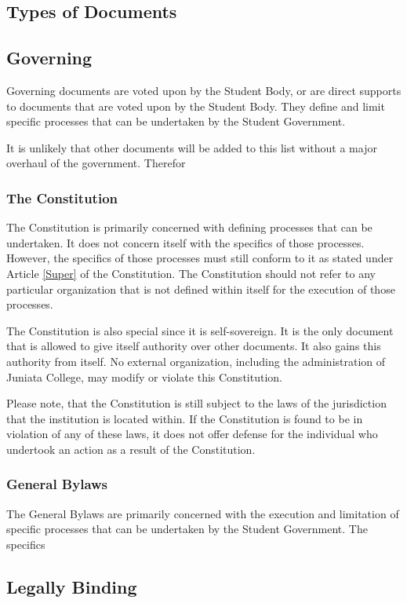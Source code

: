 \documentclass[12pt, letterpaper]{report}
\begin{document}
	\begin{linenumbers}
	\modulolinenumbers[5]
	\pagewiselinenumbers
	\chapter{Types of Documents}
        \section{Governing}
        Governing documents are voted upon by the Student Body, or are direct supports to documents that are voted upon by the Student Body. They define and limit specific processes that can be undertaken by the Student Government.  \par It is unlikely that other documents will be added to this list without a major overhaul of the government. Therefor
        \subsection{The Constitution}
        The Constitution is primarily concerned with defining processes that can be undertaken. It does not concern itself with the specifics of those processes. However, the specifics of those processes must still conform to it as stated under Article \ref{Super} of the Constitution. The Constitution should not refer to any particular organization that is not defined within itself for the execution of those processes.
        \par The Constitution is also special since it is self-sovereign. It is the only document that is allowed to give itself authority over other documents. It also gains this authority from itself. No external organization, including the administration of Juniata College, may modify or violate this Constitution. 
        \par Please note, that the Constitution is still subject to the laws of the jurisdiction that the institution is located within. If the Constitution is found to be in violation of any of these laws, it does not offer defense for the individual who undertook an action as a result of the Constitution. 
        \subsection{General Bylaws}
        The General Bylaws are primarily concerned with the execution and limitation of specific processes that can be undertaken by the Student Government. The specifics 
	    \section{Legally Binding}

\end{linenumbers}
\end{document}
